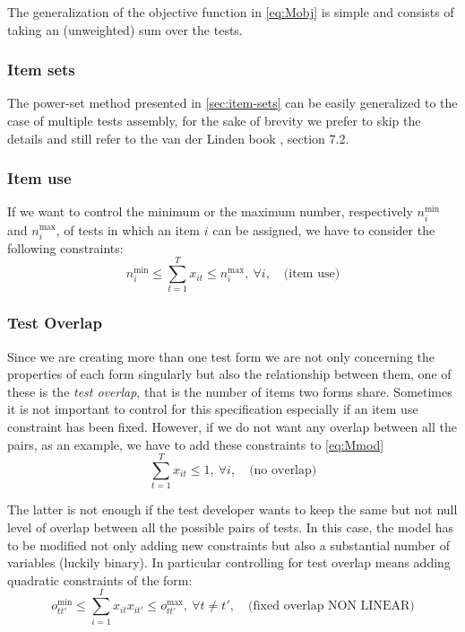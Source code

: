 The generalization of the objective function in \eqref{eq:Mobj} is simple and consists of taking an (unweighted) sum over the tests.



\subsubsection{Item sets}
The power-set method presented in \ref{sec:item-sets} can be easily generalized to the case of multiple tests assembly, for the sake of brevity we prefer to skip the details and still refer to the van der Linden book \cite{VanDerLinden2005}, section 7.2.
\subsubsection{Item use}
If we want to control the minimum or the maximum number, respectively $n^{\min}_i$ and $n^{\max}_i$, of tests in which an item $i$ can be assigned, we have to consider the following constraints:
\begin{subequations}[resume]
	\begin{equation}\label{eq:Mmod:Muse}
	n^{\min}_i \le \sum_{t=1}^T x_{it} \le n^{\max}_i, \ \forall i, \quad \mbox{(item use)}
	\end{equation}
\end{subequations}

\subsubsection{Test Overlap}\label{sec:test-overlap}
Since we are creating more than one test form we are not only concerning the properties of each form singularly but also the relationship between them, one of these is the \emph{test overlap}, that is the number of items two forms share. Sometimes it is not important to control for this specification especially if an item use constraint has been fixed. However, if we do not want any overlap between all the pairs, as an example, we have to add these constraints to \eqref{eq:Mmod}
\begin{subequations}[resume]
	\begin{equation}\label{eq:Mmod:noOL}
	\sum_{t=1}^T{x_{it}} \leq 1, \ \forall i, \quad \mbox{(no overlap)}
	\end{equation}
\end{subequations}

The latter is not enough if the test developer wants to keep the same but not null level of overlap between all the possible pairs of tests.
In this case, the model has to be modified not only adding new constraints but also a substantial number of variables (luckily binary).
In particular controlling for test overlap means adding quadratic constraints of the form:
\begin{subequations}[intermezzo]
	\begin{equation*}
	o^{\min}_{tt'} \le \sum_{i=1}^I{x_{it}x_{it'}} \le o^{\max}_{tt'}, \ \forall t \neq t', \quad \mbox{(fixed overlap NON LINEAR)}
	\end{equation*}
\end{subequations}

